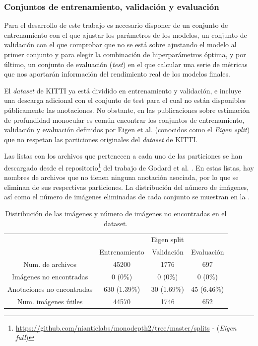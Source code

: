 \subsubsection{Conjuntos de entrenamiento, validación y evaluación}\label{conjuntos-kitti}
Para el desarrollo de este trabajo es necesario disponer de un conjunto de entrenamiento con el que ajustar los parámetros de los modelos, un conjunto de validación con el que comprobar que no se está sobre ajustando el modelo al primer conjunto y para elegir la combinación de hiperparámetros óptima, y por último, un conjunto de evaluación (\textit{test}) en el que calcular una serie de métricas que nos aportarán información del rendimiento real de los modelos finales.

El \textit{dataset} de KITTI ya está dividido en entrenamiento y validación, e incluye una descarga adicional con el conjunto de test para el cual no están disponibles públicamente las anotaciones. No obstante, en las publicaciones sobre estimación de profundidad monocular \cite{visiontransformersDPT, monodepth,midas-intel, bts} es común encontrar los conjuntos de entrenamiento, validación y evaluación definidos por Eigen et al. \cite{eigen-multi-scale} (conocidos como el \textit{Eigen split}) que no respetan las particiones originales del \textit{dataset} de KITTI. 

Las listas con los archivos que pertenecen a cada uno de las particiones se han descargado desde el repositorio\footnote{\url{https://github.com/nianticlabs/monodepth2/tree/master/splits} - (\textit{Eigen full})} del trabajo de Godard et al. \cite{monodepth}. En estas listas, hay nombres de archivos que no tienen ninguna anotación asociada, por lo que se eliminan de sus respectivas particiones. La distribución del número de imágenes, así como el número de imágenes eliminadas de cada conjunto se muestran en la .

\begin{table}[H]
\centering
\begin{tabular}{@{}cccc@{}}
\toprule
\multicolumn{1}{l}{}       & \multicolumn{1}{l}{} & \multicolumn{1}{l}{Eigen split} & \multicolumn{1}{l}{} \\ \cmidrule(l){2-4} 
\rowcolor[HTML]{FFFFFF} 
                        & Entrenamiento & Validación & Evaluación \\ \midrule
\rowcolor[HTML]{EFEFEF} 
Num. de archivos        & 45200         & 1776       & 697        \\
\rowcolor[HTML]{FFFFFF} 
Imágenes no encontradas & 0 (0\%)       & 0 (0\%)    & 0 (0\%)    \\
\rowcolor[HTML]{EFEFEF} 
Anotaciones no encontradas & 630 (1.39\%)         & 30 (1.69\%)                     & 45 (6.46\%)          \\
\rowcolor[HTML]{FFFFFF} 
Num. imágenes útiles    & 44570         & 1746       & 652        \\ \bottomrule
\end{tabular}
\caption{Distribución de las imágenes y número de imágenes no encontradas en el dataset.}
\label{tab:kitti-splits}
\end{table}

